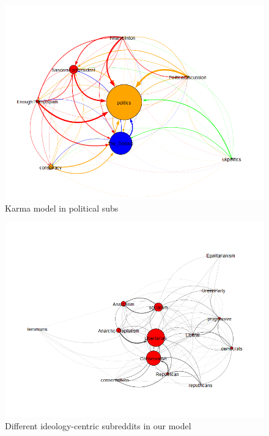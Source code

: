 \documentclass[11pt]{article}
\begin{document}
\begin{figure}[h]
	\includegraphics[width=\textwidth]{img/karma_model.png}
	\caption{\label{karma_net_big} Karma model in political subs}
\end{figure}

\begin{figure}[h]
	\includegraphics[width=\textwidth]{img/ideology_network.png}
	\caption{\label{ideology_net_big} Different ideology-centric subreddits in our model}
\end{figure}
\end{document}
